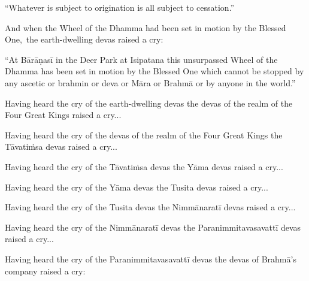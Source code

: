 \begin{english-only-hang}
  ``Whatever is subject to origination is all subject to cessation.''
\end{english-only-hang}

\begin{english-only-hang}
  And when the Wheel of the Dhamma had been set in motion by the Blessed One, the earth-dwelling devas raised a cry:
\end{english-only-hang}

\begin{english-only-hang}
  ``At Bārāṇasī in the Deer Park at Isipatana this unsurpassed Wheel of the Dhamma has been set in motion by the Blessed One which cannot be stopped by any ascetic or brahmin or deva or Māra or Brahmā or by anyone in the world.''
\end{english-only-hang}

\begin{english-only-hang}
  Having heard the cry of the earth-dwelling devas the devas of the realm of the Four Great Kings raised a cry...
\end{english-only-hang}

\begin{english-only-hang}
  Having heard the cry of the devas of the realm of the Four Great Kings the Tāvatiṁsa devas raised a cry...
\end{english-only-hang}

\begin{english-only-hang}
  Having heard the cry of the Tāvatiṁsa devas the Yāma devas raised a cry...
\end{english-only-hang}

\begin{english-only-hang}
  Having heard the cry of the Yāma devas the Tusita devas raised a cry...
\end{english-only-hang}

\begin{english-only-hang}
  Having heard the cry of the Tusita devas the Nimmānaratī devas raised a cry...
\end{english-only-hang}

\begin{english-only-hang}
  Having heard the cry of the Nimmānaratī devas the Paranimmitavasavattī devas raised a cry...
\end{english-only-hang}

\begin{english-only-hang}
  Having heard the cry of the Paranimmitavasavattī devas the devas of Brahmā's company raised a cry:
\end{english-only-hang}

